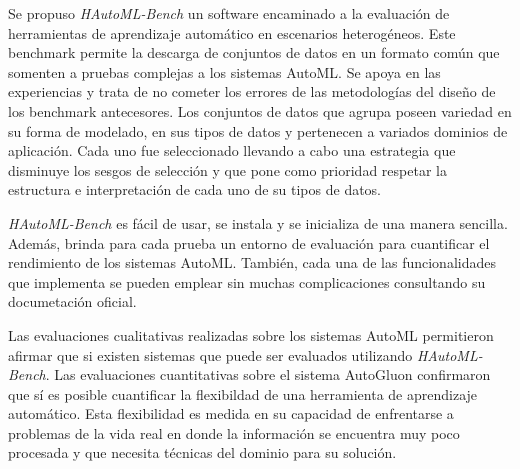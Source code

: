 \begin{conclusions}
Se propuso \textit{HAutoML-Bench} un software encaminado a la evaluación de herramientas de aprendizaje automático en escenarios heterogéneos.
Este benchmark permite la descarga de conjuntos de datos en un formato común que somenten a pruebas complejas a los sistemas AutoML. 
Se apoya en las experiencias y trata de no cometer los errores de las metodologías del diseño de los benchmark antecesores. Los conjuntos de datos que agrupa 
poseen variedad en su forma de modelado, en sus tipos de datos y pertenecen a variados dominios de aplicación. Cada uno fue seleccionado llevando a cabo una estrategia 
que disminuye los sesgos de selección y que pone como prioridad respetar la estructura e interpretación de cada uno de su tipos de datos.

\textit{HAutoML-Bench} es fácil de usar, se instala y se inicializa de una manera sencilla. Además, brinda para cada prueba un entorno de evaluación para cuantificar 
el rendimiento de los sistemas AutoML. También, cada una de las funcionalidades que implementa se pueden emplear sin muchas complicaciones consultando su documetación 
oficial.

Las evaluaciones cualitativas realizadas sobre los sistemas AutoML permitieron afirmar que si existen sistemas que puede ser evaluados utilizando \textit{HAutoML-Bench}.
Las evaluaciones cuantitativas sobre el sistema AutoGluon confirmaron que sí es posible cuantificar la flexibildad de una herramienta de aprendizaje automático. Esta 
flexibilidad es medida en su capacidad de enfrentarse a problemas de la vida real en donde la información se encuentra muy poco procesada y que necesita técnicas del dominio 
para su solución.
\end{conclusions}
